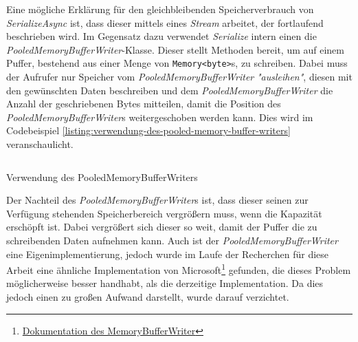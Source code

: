 Eine mögliche Erklärung für den gleichbleibenden Speicherverbrauch von \textit{SerializeAsync} ist, dass dieser mittels eines \textit{Stream} arbeitet, der fortlaufend beschrieben wird. Im Gegensatz dazu verwendet \textit{Serialize} intern einen die \textit{PooledMemoryBufferWriter}-Klasse. Dieser stellt Methoden bereit, um auf einem Puffer, bestehend aus einer Menge von \texttt{Memory<byte>}s, zu schreiben. Dabei muss der Aufrufer nur Speicher vom \textit{PooledMemoryBufferWriter} \textit{"ausleihen"}, diesen mit den gewünschten Daten beschreiben und dem \textit{PooledMemoryBufferWriter} die Anzahl der geschriebenen Bytes mitteilen, damit die Position des \textit{PooledMemoryBufferWriter}s weitergeschoben werden kann. Dies wird im Codebeispiel \ref{listing:verwendung-des-pooled-memory-buffer-writers} veranschaulicht.

\begin{listing}[h]
    \inputminted[framesep=2mm, baselinestretch=1.2, fontsize=\normalsize, linenos]{csharp}{codes/pooled_memory_buffer_writer_example.cs}
    \caption{Verwendung des PooledMemoryBufferWriters}
    \label{listing:verwendung-des-pooled-memory-buffer-writers}
\end{listing}

Der Nachteil des \textit{PooledMemoryBufferWriter}s ist, dass dieser seinen zur Verfügung stehenden Speicherbereich vergrößern muss, wenn die Kapazität erschöpft ist. Dabei vergrößert sich dieser so weit, damit der Puffer die zu schreibenden Daten aufnehmen kann. Auch ist der \textit{PooledMemoryBufferWriter} eine Eigenimplementierung, jedoch wurde im Laufe der Recherchen für diese Arbeit eine ähnliche Implementation von Microsoft\footnote{\href{https://docs.microsoft.com/en-us/dotnet/api/microsoft.toolkit.highperformance.buffers.memorybufferwriter-1?view=win-comm-toolkit-dotnet-7.0}{Dokumentation des MemoryBufferWriter}} gefunden, die dieses Problem möglicherweise besser handhabt, als die derzeitige Implementation. Da dies jedoch einen zu großen Aufwand darstellt, wurde darauf verzichtet.


